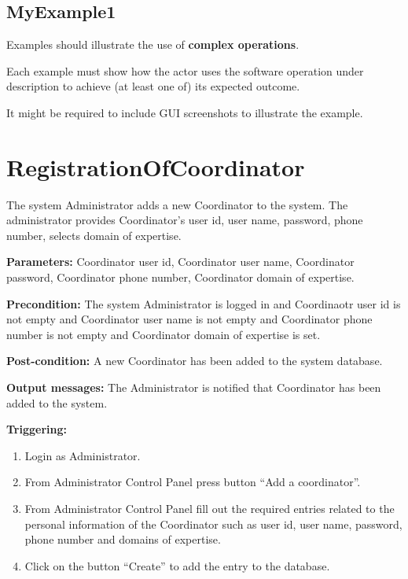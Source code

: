  
\subsection{MyExample1}
Examples should illustrate the use of \textbf{complex operations}.

Each example must show how the actor uses the software operation under
description to achieve (at least one of) its expected outcome.

It might be required to include GUI screenshots to illustrate the example.



\section{RegistrationOfCoordinator}
\label{operation:RegistrationOfCoordinator}
The system Administrator adds a new Coordinator to the system. The administrator 
provides Coordinator's user id, user name, password, phone number, selects
domain of expertise.

\begin{description}

\item \textbf{Parameters:} Coordinator user id, Coordinator user name,
Coordinator password, Coordinator phone number, Coordinator domain of expertise.
\item \textbf{Precondition:} The system Administrator is logged in and
Coordinaotr user id is not empty and Coordinator user name is not empty and
Coordinator phone number is not empty and Coordinator domain of expertise is
set.
\item \textbf{Post-condition:} A new Coordinator has been added to the system
database.
\item \textbf{Output messages:} The Administrator is notified that Coordinator
has been added to the system.

\item \textbf{Triggering:}
\begin{enumerate}
\item Login as Administrator.
\item From Administrator Control Panel press button ``Add a coordinator''.
\item From Administrator Control Panel fill out the required entries related to
the personal information of the Coordinator such as user id, user name,
password, phone number and domains of expertise.
\item Click on the button ``Create'' to add the entry to the database.
\end{enumerate}
 
\end{description}


